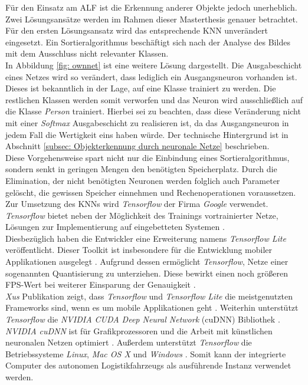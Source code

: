 		
		\newpage
		Für den Einsatz am ALF ist die Erkennung anderer Objekte jedoch unerheblich. Zwei Lösungsansätze werden im Rahmen dieser Masterthesis genauer betrachtet. Für den ersten Lösungsansatz wird das entsprechende KNN unverändert eingesetzt. Ein Sortieralgorithmus beschäftigt sich nach der Analyse des Bildes mit dem Ausschluss nicht relevanter Klassen.\\
		
		In Abbildung \ref{fig: ownnet} ist eine weitere Lösung dargestellt. Die Ausgabeschicht eines Netzes wird so verändert, dass lediglich ein Ausgangsneuron vorhanden ist. Dieses ist bekanntlich in der Lage, auf eine Klasse trainiert zu werden. Die restlichen Klassen werden somit verworfen und das Neuron wird ausschließlich auf die Klasse \textit{Person} trainiert. Hierbei sei zu beachten, dass diese Veränderung nicht mit einer \textit{Softmax} Ausgabeschicht zu realisieren ist, da das Ausgangsneuron in jedem Fall die Wertigkeit eins haben würde. Der technische Hintergrund ist in Abschnitt \ref{subsec: Objekterkennung durch neuronale Netze} beschrieben.\\
		
		Diese Vorgehensweise spart nicht nur die Einbindung eines Sortieralgorithmus, sondern senkt in geringen Mengen den benötigten Speicherplatz. Durch die Elimination, der nicht benötigten Neuronen werden folglich auch Parameter gelöscht, die gewissen Speicher einnehmen und Rechenoperationen voraussetzen.\\
		
		Zur Umsetzung des KNNs wird \textit{Tensorflow} der Firma \textit{Google} verwendet. \textit{Tensorflow} bietet neben der Möglichkeit des Trainings vortrainierter Netze, Lösungen zur Implementierung auf eingebetteten Systemen \cite{frameworks}.\\
		
		Diesbezüglich haben die Entwickler eine Erweiterung namens \textit{Tensorflow Lite} veröffentlicht. Dieser Toolkit ist insbesondere für die Entwicklung mobiler Applikationen ausgelegt \cite{tflite}. Aufgrund dessen ermöglicht \textit{Tensorflow}, Netze einer sogenannten Quantisierung zu unterziehen. Diese bewirkt einen noch größeren FPS-Wert bei weiterer Einsparung der Genauigkeit \cite{tflite}.\\
		
		\textit{Xus} Publikation zeigt, dass \textit{Tensorflow} und \textit{Tensorflow Lite} die meistgenutzten Frameworks sind, wenn es um mobile Applikationen geht \cite{warumtf}. Weiterhin unterstützt \textit{Tensorflow} die \textit{NVIDIA CUDA Deep Neural Network} (cuDNN) Bibliothek \cite{frameworks}. \textit{NVIDIA cuDNN} ist für Grafikprozessoren und die Arbeit mit künstlichen neuronalen Netzen optimiert \cite{frameworks}. Außerdem unterstützt \textit{Tensorflow} die Betriebssysteme \textit{Linux}, \textit{Mac OS X} und \textit{Windows} \cite{frameworks}. Somit kann der integrierte Computer des autonomen Logistikfahrzeugs als ausführende Instanz verwendet werden.\\
		

